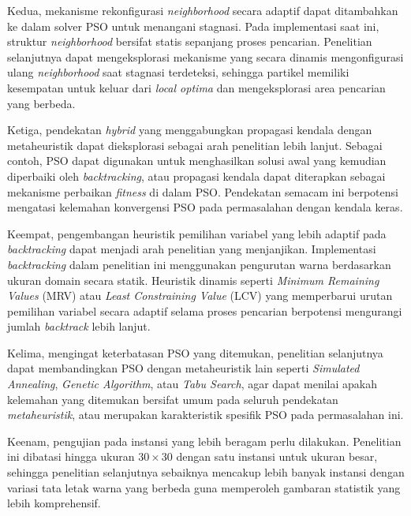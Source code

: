 Kedua, mekanisme rekonfigurasi \textit{neighborhood} secara adaptif dapat ditambahkan ke dalam solver PSO untuk menangani stagnasi. Pada implementasi saat ini, struktur \textit{neighborhood} bersifat statis sepanjang proses pencarian. Penelitian selanjutnya dapat mengeksplorasi mekanisme yang secara dinamis mengonfigurasi ulang \textit{neighborhood} saat stagnasi terdeteksi, sehingga partikel memiliki kesempatan untuk keluar dari \textit{local optima} dan mengeksplorasi area pencarian yang berbeda.

Ketiga, pendekatan \textit{hybrid} yang menggabungkan propagasi kendala dengan metaheuristik dapat dieksplorasi sebagai arah penelitian lebih lanjut. Sebagai contoh, PSO dapat digunakan untuk menghasilkan solusi awal yang kemudian diperbaiki oleh \textit{backtracking}, atau propagasi kendala dapat diterapkan sebagai mekanisme perbaikan \textit{fitness} di dalam PSO. Pendekatan semacam ini berpotensi mengatasi kelemahan konvergensi PSO pada permasalahan dengan kendala keras.

Keempat, pengembangan heuristik pemilihan variabel yang lebih adaptif pada \textit{backtracking} dapat menjadi arah penelitian yang menjanjikan. Implementasi \textit{backtracking} dalam penelitian ini menggunakan pengurutan warna berdasarkan ukuran domain secara statik. Heuristik dinamis seperti \textit{Minimum Remaining Values} (MRV) atau \textit{Least Constraining Value} (LCV) yang memperbarui urutan pemilihan variabel secara adaptif selama proses pencarian berpotensi mengurangi jumlah \textit{backtrack} lebih lanjut.

Kelima, mengingat keterbatasan PSO yang ditemukan, penelitian selanjutnya dapat membandingkan PSO dengan metaheuristik lain seperti \textit{Simulated Annealing}, \textit{Genetic Algorithm}, atau \textit{Tabu Search}, agar dapat menilai apakah kelemahan yang ditemukan bersifat umum pada seluruh pendekatan \textit{metaheuristik}, atau merupakan karakteristik spesifik PSO pada permasalahan ini.

Keenam, pengujian pada instansi yang lebih beragam perlu dilakukan. Penelitian ini dibatasi hingga ukuran $30 \times 30$ dengan satu instansi untuk ukuran besar, sehingga penelitian selanjutnya sebaiknya mencakup lebih banyak instansi dengan variasi tata letak warna yang berbeda guna memperoleh gambaran statistik yang lebih komprehensif.